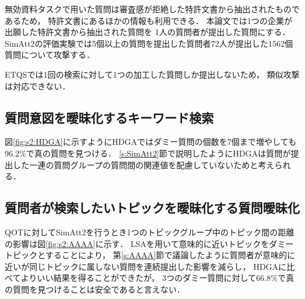 \documentclass[master]{suribt}
\theoremstyle{definition}
\begin{document}
 無効資料タスクで用いた質問は審査感が拒絶した特許文書から抽出されたものであるため，
 特許文書にあるほかの情報も利用できる．
 本論文では1つの企業が出願した特許文書から抽出された質問を
 1人の質問者が提出した質問にする．
 SimAtt2の評価実験では5個以上の質問を提出した質問者72人が提出した1562個質問について攻撃する．

 ETQSでは1回の検索に対して1つの加工した質問しか提出しないため，
 類似攻撃は対応できない．

 \subsection{質問意図を曖昧化するキーワード検索}
 図\ref{fig:s2:HDGA}に示すようにHDGAではダミー質問の個数を7個まで増やしても$96.2\%$で真の質問を見つける．
 \ref{s:SimAtt2}節で説明したようにHDGAは質問が提出した一連の質問グループの質問間の関連値を配慮していないためと考えられる．

 \subsection{質問者が検索したいトピックを曖昧化する質問曖昧化}
 QOTに対してSimAtt2を行うとき1つのトピックグループ中のトピック間の距離の影響は図\ref{fig:s2:AAAA}に示す．
 LSAを用いて意味的に近いトピックをダミートピックとすることにより，
 第\ref{s:AAAA}節で議論したように質問者が意味的に近いが同じトピックに属しない質問を連続提出した影響を減らし，
 HDGAに比べてよりいい結果を得ることができたが，
 3つのダミー質問に対して$66.8\%$で真の質問を見つけることは安全であると言えない．
\end{document}
